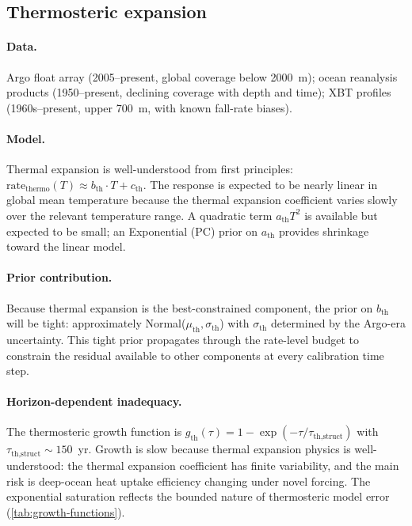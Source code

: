 \documentclass[11pt]{article}
\begin{document}
\subsection{Thermosteric expansion}
\label{sec:thermo}

\paragraph{Data.}  Argo float array (2005--present, global coverage below 2000~m); ocean reanalysis products (1950--present, declining coverage with depth and time); XBT profiles (1960s--present, upper 700~m, with known fall-rate biases).

\paragraph{Model.}  Thermal expansion is well-understood from first principles: $\text{rate}_{\text{thermo}}(T) \approx b_{\text{th}} \cdot T + c_{\text{th}}$.  The response is expected to be nearly linear in global mean temperature because the thermal expansion coefficient varies slowly over the relevant temperature range.  A quadratic term $a_{\text{th}} T^2$ is available but expected to be small; an Exponential (PC) prior on $a_{\text{th}}$ provides shrinkage toward the linear model.

\paragraph{Prior contribution.}  Because thermal expansion is the best-constrained component, the prior on $b_{\text{th}}$ will be tight: approximately Normal($\mu_{\text{th}}, \sigma_{\text{th}}$) with $\sigma_{\text{th}}$ determined by the Argo-era uncertainty.  This tight prior propagates through the rate-level budget to constrain the residual available to other components at every calibration time step.

\paragraph{Horizon-dependent inadequacy.}  The thermosteric growth function is $g_{\text{th}}(\tau) = 1 - \exp(-\tau / \tau_{\text{th,struct}})$ with $\tau_{\text{th,struct}} \sim 150$~yr.  Growth is slow because thermal expansion physics is well-understood: the thermal expansion coefficient has finite variability, and the main risk is deep-ocean heat uptake efficiency changing under novel forcing.  The exponential saturation reflects the bounded nature of thermosteric model error (\cref{tab:growth-functions}).
\end{document}
